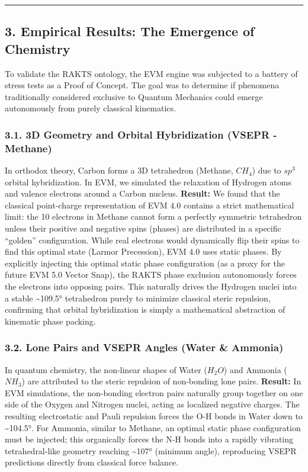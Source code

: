 \documentclass[
]{article}
\begin{document}
\begin{center}\rule{0.5\linewidth}{0.5pt}\end{center}

\subsection{3. Empirical Results: The Emergence of
Chemistry}\label{empirical-results-the-emergence-of-chemistry}

To validate the RAKTS ontology, the EVM engine was subjected to a
battery of stress tests as a Proof of Concept. The goal was to determine
if phenomena traditionally considered exclusive to Quantum Mechanics
could emerge autonomously from purely classical kinematics.

\subsubsection{3.1. 3D Geometry and Orbital Hybridization (VSEPR -
Methane)}\label{d-geometry-and-orbital-hybridization-vsepr---methane}

In orthodox theory, Carbon forms a 3D tetrahedron (Methane, \(CH_4\))
due to \(sp^3\) orbital hybridization. In EVM, we simulated the
relaxation of Hydrogen atoms and valence electrons around a Carbon
nucleus. \textbf{Result:} We found that the classical point-charge
representation of EVM 4.0 contains a strict mathematical limit: the 10
electrons in Methane cannot form a perfectly symmetric tetrahedron
unless their positive and negative spins (phases) are distributed in a
specific ``golden'' configuration. While real electrons would
dynamically flip their spins to find this optimal state (Larmor
Precession), EVM 4.0 uses static phases. By explicitly injecting this
optimal static phase configuration (as a proxy for the future EVM 5.0
Vector Snap), the RAKTS phase exclusion autonomously forces the
electrons into opposing pairs. This naturally drives the Hydrogen nuclei
into a stable \textasciitilde109.5° tetrahedron purely to minimize
classical steric repulsion, confirming that orbital hybridization is
simply a mathematical abstraction of kinematic phase packing.

\subsubsection{3.2. Lone Pairs and VSEPR Angles (Water \&
Ammonia)}\label{lone-pairs-and-vsepr-angles-water-ammonia}

In quantum chemistry, the non-linear shapes of Water (\(H_2O\)) and
Ammonia (\(NH_3\)) are attributed to the steric repulsion of non-bonding
lone pairs. \textbf{Result:} In EVM simulations, the non-bonding
electron pairs naturally group together on one side of the Oxygen and
Nitrogen nuclei, acting as localized negative charges. The resulting
electrostatic and Pauli repulsion forces the O-H bonds in Water down to
\textasciitilde104.5°. For Ammonia, similar to Methane, an optimal
static phase configuration must be injected; this organically forces the
N-H bonds into a rapidly vibrating tetrahedral-like geometry reaching
\textasciitilde107° (minimum angle), reproducing VSEPR predictions
directly from classical force balance.
\end{document}
